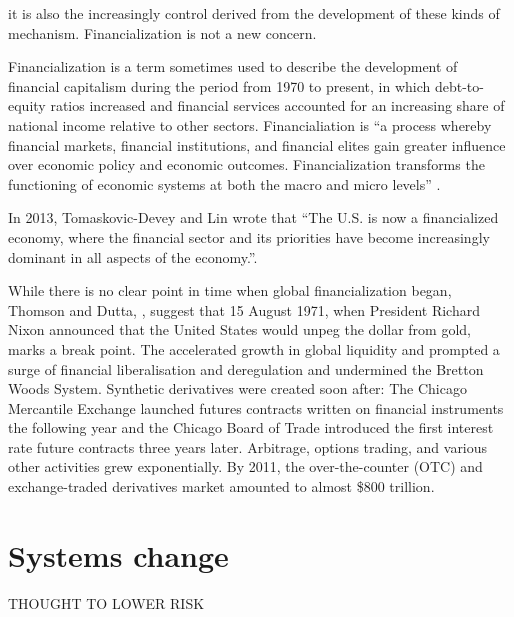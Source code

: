 it is also the increasingly control derived from the development of these kinds of mechanism. 
Financialization is not a new concern.

Financialization is a term %
sometimes used to describe the development of financial capitalism during the period from 1970 to present, in which debt-to-equity ratios increased and financial services accounted for an increasing share of national income relative to other sectors. %
Financialiation is %
``a process whereby financial markets, financial institutions, and financial elites gain greater influence over economic policy and economic outcomes. Financialization transforms the functioning of economic systems at both the macro and micro levels'' \cite{palleyFinancializationWhatIt2007}. 

In 2013, Tomaskovic-Devey and Lin wrote that ``The U.S. is now a financialized economy, where the financial sector and its priorities have become increasingly dominant in all aspects of the economy.''\cite{tomaskovic-deveyFinancializationCausesInequality2013}. 

While there is no clear point in time when global financialization began, Thomson and Dutta,  \cite{thomsonFinancialisationPrimer2018}, suggest that 15 August 1971, when President Richard Nixon announced that the United States would unpeg the dollar from gold, marks a break point. The accelerated growth in global liquidity and prompted a surge of financial liberalisation and deregulation and undermined the Bretton Woods System.  Synthetic derivatives were created soon after: The Chicago Mercantile Exchange launched futures contracts written on financial instruments the following year and the Chicago Board of Trade introduced the first interest rate future contracts three years later. Arbitrage, options trading, and various other activities grew exponentially. By 2011, the over-the-counter (OTC) and exchange-traded derivatives market amounted to almost \$800 trillion.  %


\section{Systems change}

 THOUGHT TO LOWER RISK


